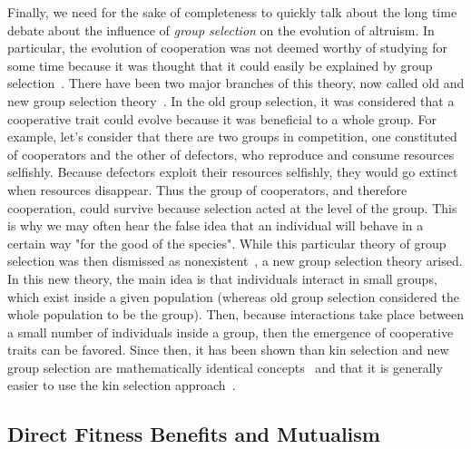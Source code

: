    Finally, we need for the sake of completeness to quickly talk about the long time debate about the influence of \emph{group selection} on the evolution of altruism. In particular, the evolution of cooperation was not deemed worthy of studying for some time because it was thought that it could easily be explained by group selection~\parencite{Axelrod1981}. There have been two major branches of this theory, now called old and new group selection theory~\parencite{West2007a}. In the old group selection, it was considered that a cooperative trait could evolve because it was beneficial to a whole group. For example, let's consider that there are two groups in competition, one constituted of cooperators and the other of defectors, who reproduce and consume resources selfishly. Because defectors exploit their resources selfishly, they would go extinct when resources disappear. Thus the group of cooperators, and therefore cooperation, could survive because selection acted at the level of the group. This is why we may often hear the false idea that an individual will behave in a certain way "for the good of the species". While this particular theory of group selection was then dismissed as nonexistent~\parencite{MaynardSmith1976}, a new group selection theory arised. In this new theory, the main idea is that individuals interact in small groups, which exist inside a given population (whereas old group selection considered the whole population to be the group). Then, because interactions take place between a small number of individuals inside a group, then the emergence of cooperative traits can be favored. Since then, it has been shown than kin selection and new group selection are mathematically identical concepts~\parencite{Hamilton1975, VanBaalen1998, Gardner2007} and that it is generally easier to use the kin selection approach~\parencite{West2007a}.


  \subsection{Direct Fitness Benefits and Mutualism}

